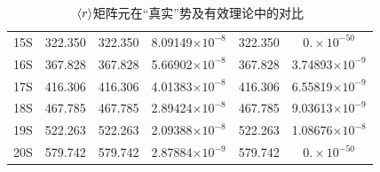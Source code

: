 \documentclass[cs4size,titlepage,twoside]{ctexart}
\begin{document}
\begin{table}[!bp]
\begin{tabular}{|cccccc|}
		15S                   & 322.350                                  & 322.350                                        & 8.09149$\times10^{-8}$                         & 322.350                                                                            & $0.\times10^{-50}$       \\
		16S                   & 367.828                                  & 367.828                                        & 5.66902$\times10^{-8}$                         & 367.828                                                                            & 3.74893$\times10^{-9}$   \\
		17S                   & 416.306                                  & 416.306                                        & 4.01383$\times10^{-8}$                         & 416.306                                                                            & 6.55819$\times10^{-9}$   \\
		18S                   & 467.785                                  & 467.785                                        & 2.89424$\times10^{-8}$                         & 467.785                                                                            & 9.03613$\times10^{-9}$   \\
		19S                   & 522.263                                  & 522.263                                        & 2.09388$\times10^{-8}$                         & 522.263                                                                            & 1.08676$\times10^{-8}$   \\
		20S                   & 579.742                                  & 579.742                                        & 2.87884$\times10^{-9}$                         & 579.742                                                                            & $0.\times10^{-50}$       \\\hline
	\end{tabular}
	\caption{$\displaystyle\expval{r}$矩阵元在“真实”势及有效理论中的对比}\label{evr}
\end{table}
\end{document}
